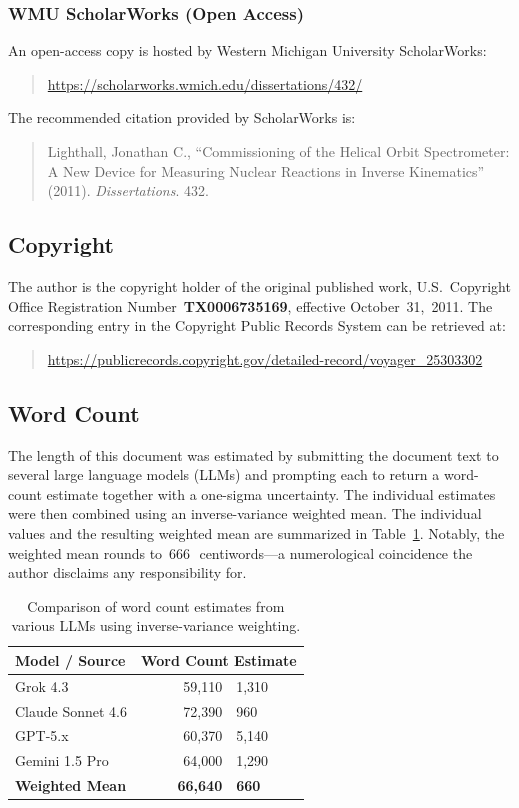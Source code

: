 \subsubsection*{WMU ScholarWorks (Open Access)}
An open-access copy is hosted by Western Michigan University ScholarWorks:
\begin{quote}
\url{https://scholarworks.wmich.edu/dissertations/432/}
\end{quote}
The recommended citation provided by ScholarWorks is:
\begin{quote}
Lighthall, Jonathan C., ``Commissioning of the Helical Orbit Spectrometer: A New Device for Measuring Nuclear Reactions in Inverse Kinematics'' (2011). \emph{Dissertations}. 432.
\end{quote}

\subsection{Copyright}
The author is the copyright holder of the original published work, U.S.\ Copyright Office Registration Number~\textbf{TX0006735169}, effective October~31,~2011. The corresponding entry in the Copyright Public Records System can be retrieved at:
\begin{quote}\sloppy
\url{https://publicrecords.copyright.gov/detailed-record/voyager_25303302}
\end{quote}

\subsection{Word Count}
The length of this document was estimated by submitting the document text to several large language models (LLMs) and prompting each to return a word-count estimate together with a one-sigma uncertainty. The individual estimates were then combined using an inverse-variance weighted mean. The individual values and the resulting weighted mean are summarized in Table~\ref{tab:word_count}. Notably, the weighted mean rounds to \sigil\,$666$\,\sigil\ centiwords---a numerological coincidence the author disclaims any responsibility for.

\begin{table}[h]
\centering
\begin{tabular}{|l|r@{ $\pm$ }l|}
\hline
\textbf{Model / Source} & \multicolumn{2}{c|}{\textbf{Word Count Estimate}} \\ \hline
Grok 4.3 & 59,110 & 1,310 \\ \hline
Claude Sonnet 4.6 & 72,390 & 960 \\ \hline
GPT-5.x & 60,370 & 5,140 \\ \hline
Gemini 1.5 Pro & 64,000 & 1,290 \\ \hline
\hline
\textbf{Weighted Mean} & \textbf{66,640} & \textbf{660} \\ \hline
\end{tabular}
\caption{Comparison of word count estimates from various LLMs using inverse-variance weighting.}
\label{tab:word_count}
\end{table}

